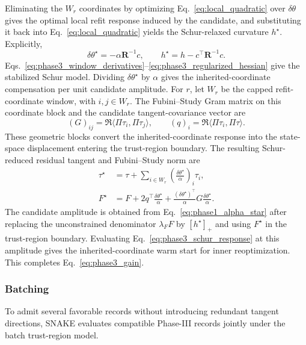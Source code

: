 \documentclass[
  reprint,
  amsmath,
  amssymb,
  aps,
  pra,
  nofootinbib,
  superscriptaddress,
  floatfix
]{revtex4-2}
\begin{document}
Eliminating the \(W_r\) coordinates by optimizing Eq.~\eqref{eq:local_quadratic} over $\delta\theta$ gives the optimal local refit response induced by the candidate, and substituting it back into Eq.~\eqref{eq:local_quadratic} yields the Schur-relaxed curvature $h^\star$. Explicitly,
\begin{equation}
\delta\theta^\star=-\alpha\mathbf R^{-1}c,
\qquad
h^\star=h-c^{\top}\mathbf R^{-1}c .
\label{eq:phase3_schur_response}
\end{equation}
Eqs.~\eqref{eq:phase3_window_derivatives}--\eqref{eq:phase3_regularized_hessian} give the stabilized Schur model. Dividing $\delta\theta^\star$ by $\alpha$ gives the inherited-coordinate compensation per unit candidate amplitude.
For \(r\), let \(W_r\) be the capped refit-coordinate window, with
\(i,j\in W_r\). The Fubini--Study Gram matrix on this coordinate block and the
candidate tangent-covariance vector are
\begin{equation*}
(G)_{ij}=\Re\langle\Pi\tau_i,\Pi\tau_j\rangle,
\qquad
(q)_i=\Re\langle\Pi\tau_i,\Pi\tau\rangle.
\end{equation*}
These geometric blocks convert the inherited-coordinate response into the
state-space displacement entering the trust-region boundary. The resulting
Schur-reduced residual tangent and Fubini--Study norm are
\begin{equation}
\begin{aligned}
\tau^\star
&=\tau+\sum_{i\in W_r}\left(\frac{\delta\theta^\star}{\alpha}\right)_i\tau_i,\\
F^\star
&=F+2q^{\top}\frac{\delta\theta^\star}{\alpha}
+\frac{(\delta\theta^\star)^{\top}}{\alpha}G\frac{\delta\theta^\star}{\alpha}.
\end{aligned}
\label{eq:phase3_star_geometry}
\end{equation}
The candidate amplitude is obtained from
Eq.~\eqref{eq:phase1_alpha_star} after replacing the unconstrained denominator
\(\lambda_FF\) by \([h^\star]_+\) and using \(F^\star\) in the trust-region
boundary. Evaluating Eq.~\eqref{eq:phase3_schur_response} at this amplitude
gives the inherited-coordinate warm start for inner reoptimization.
This completes Eq.~\eqref{eq:phase3_gain}.

\subsubsection{Batching}
To admit several favorable records without introducing redundant tangent
directions, \textsc{SNAKE} evaluates compatible Phase-III records jointly under
the batch trust-region model.
\end{document}
